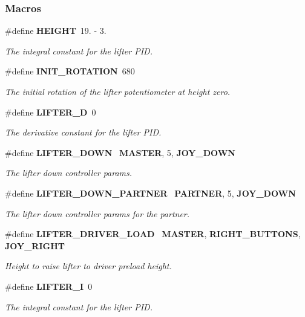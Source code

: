 \subsubsection*{Macros}
\begin{DoxyCompactItemize}
\item 
\#define \textbf{ H\+E\+I\+G\+HT}~19. -\/ 3.
\begin{DoxyCompactList}\small\item\em The integral constant for the lifter P\+ID. \end{DoxyCompactList}\item 
\#define \textbf{ I\+N\+I\+T\+\_\+\+R\+O\+T\+A\+T\+I\+ON}~680
\begin{DoxyCompactList}\small\item\em The initial rotation of the lifter potentiometer at height zero. \end{DoxyCompactList}\item 
\#define \textbf{ L\+I\+F\+T\+E\+R\+\_\+D}~0
\begin{DoxyCompactList}\small\item\em The derivative constant for the lifter P\+ID. \end{DoxyCompactList}\item 
\#define \textbf{ L\+I\+F\+T\+E\+R\+\_\+\+D\+O\+WN}~\textbf{ M\+A\+S\+T\+ER}, 5, \textbf{ J\+O\+Y\+\_\+\+D\+O\+WN}
\begin{DoxyCompactList}\small\item\em The lifter down controller params. \end{DoxyCompactList}\item 
\#define \textbf{ L\+I\+F\+T\+E\+R\+\_\+\+D\+O\+W\+N\+\_\+\+P\+A\+R\+T\+N\+ER}~\textbf{ P\+A\+R\+T\+N\+ER}, 5, \textbf{ J\+O\+Y\+\_\+\+D\+O\+WN}
\begin{DoxyCompactList}\small\item\em The lifter down controller params for the partner. \end{DoxyCompactList}\item 
\#define \textbf{ L\+I\+F\+T\+E\+R\+\_\+\+D\+R\+I\+V\+E\+R\+\_\+\+L\+O\+AD}~\textbf{ M\+A\+S\+T\+ER}, \textbf{ R\+I\+G\+H\+T\+\_\+\+B\+U\+T\+T\+O\+NS}, \textbf{ J\+O\+Y\+\_\+\+R\+I\+G\+HT}
\begin{DoxyCompactList}\small\item\em Height to raise lifter to driver preload height. \end{DoxyCompactList}\item 
\#define \textbf{ L\+I\+F\+T\+E\+R\+\_\+I}~0
\begin{DoxyCompactList}\small\item\em The integral constant for the lifter P\+ID. \end{DoxyCompactList}\item 

\end{DoxyCompactItemize}
